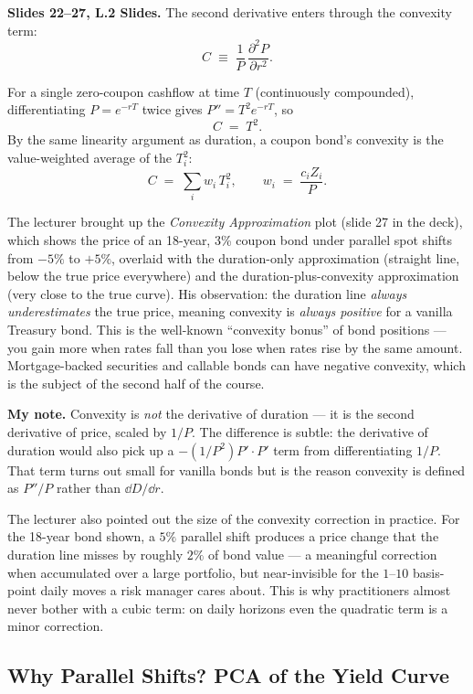 \textbf{Slides 22--27, L.2 Slides.} The second derivative enters through the
convexity term:
\[
   C \;\equiv\; \frac{1}{P}\,\frac{\partial^2 P}{\partial r^2}.
\]

For a single zero-coupon cashflow at time $T$ (continuously compounded),
differentiating $P = e^{-rT}$ twice gives $P'' = T^2 e^{-rT}$, so
\[
  C \;=\; T^2.
\]
By the same linearity argument as duration, a coupon bond's convexity is the
value-weighted average of the $T_i^2$:
\[
  C \;=\; \sum_i w_i\,T_i^2, \qquad w_i \;=\; \frac{c_i Z_i}{P}.
\]

The lecturer brought up the \emph{Convexity Approximation} plot (slide 27 in
the deck), which shows the price of an 18-year, 3\% coupon bond under
parallel spot shifts from $-5\%$ to $+5\%$, overlaid with the
duration-only approximation (straight line, below the true price everywhere)
and the duration-plus-convexity approximation (very close to the true
curve). His observation: the duration line \emph{always underestimates} the
true price, meaning convexity is \emph{always positive} for a vanilla
Treasury bond. This is the well-known ``convexity bonus'' of bond positions
--- you gain more when rates fall than you lose when rates rise by the same
amount. Mortgage-backed securities and callable bonds can have negative
convexity, which is the subject of the second half of the course.

\begin{checkpoint}
\textbf{My note.} Convexity is \emph{not} the derivative of duration --- it
is the second derivative of price, scaled by $1/P$. The difference is
subtle: the derivative of duration would also pick up a $-(1/P^2) P' \cdot P'$
term from differentiating $1/P$. That term turns out small for vanilla
bonds but is the reason convexity is defined as $P''/P$ rather than
$\dd D/\dd r$.
\end{checkpoint}

The lecturer also pointed out the size of the convexity correction in
practice. For the 18-year bond shown, a $5\%$ parallel shift produces a price
change that the duration line misses by roughly $2\%$ of bond value --- a
meaningful correction when accumulated over a large portfolio, but
near-invisible for the $1$--$10$ basis-point daily moves a risk manager cares
about. This is why practitioners almost never bother with a cubic term: on
daily horizons even the quadratic term is a minor correction.

\subsection{Why Parallel Shifts? PCA of the Yield Curve}\label{L2-sec:pca}

